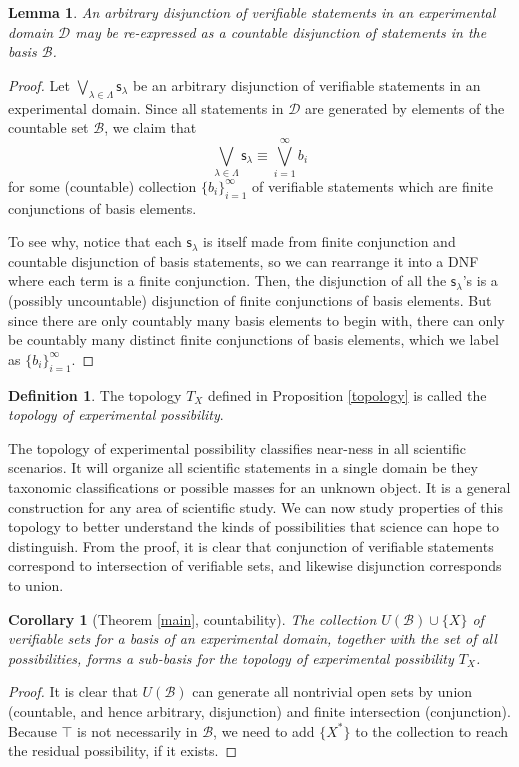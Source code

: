 \documentclass[psamsfonts]{amsart}
\newtheorem{cor}[thm]{Corollary}
\newtheorem{lem}[thm]{Lemma}
\theoremstyle{definition}
\newtheorem{defn}[thm]{Definition}
\theoremstyle{remark}
\numberwithin{equation}{section}
\def\tautology{\top}
\def\bigOR{\bigvee}
\newcommand{\stmt}[1][s] {\mathsf{#1}}
\newcommand{\edomain}[1][D] {\mathcal{#1}}
\newcommand{\basis}[1][B] {\mathcal{#1}} %
\begin{document}
\begin{lem}\label{countable_disjunction}
An arbitrary disjunction of verifiable statements in an experimental domain $\edomain$ may be re-expressed as a countable disjunction of statements in the basis $\basis$.
\end{lem}
\begin{proof}
Let $\bigOR\limits_{\lambda\in\Lambda}\stmt_{\lambda}$ be an arbitrary disjunction of verifiable statements in an experimental domain. Since all statements in $\edomain$ are generated by elements of the countable set $\basis$, we claim that $$\bigOR\limits_{\lambda\in\Lambda}\stmt_{\lambda} \equiv \bigOR\limits_{i=1}^{\infty}b_i$$ for some (countable) collection $\{b_i\}_{i=1}^{\infty}$ of verifiable statements which are finite conjunctions of basis elements. 

To see why, notice that each $\stmt_{\lambda}$ is itself made from finite conjunction and countable disjunction of basis statements, so we can rearrange it into a DNF where each term is a finite conjunction. Then, the disjunction of all the $\stmt_{\lambda}$'s is a (possibly uncountable) disjunction of finite conjunctions of basis elements. But since there are only countably many basis elements to begin with, there can only be countably many distinct finite conjunctions of basis elements, which we label as $\{b_i\}_{i=1}^{\infty}$. 
\end{proof}

\begin{defn}
The topology $T_X$ defined in Proposition \ref{topology} is called the \emph{topology of experimental possibility}.
\end{defn}

The topology of experimental possibility classifies near-ness in all scientific scenarios. It will organize all scientific statements in a single domain be they taxonomic classifications or possible masses for an unknown object. It is a general construction for any area of scientific study. We can now study properties of this topology to better understand the kinds of possibilities that science can hope to distinguish. From the proof, it is clear that conjunction of verifiable statements correspond to intersection of verifiable sets, and likewise disjunction corresponds to union. 

\begin{cor}[Theorem \ref{main}, countability]
The collection $U(\basis)\cup\{X\}$ of verifiable sets for a basis of an experimental domain, together with the set of all possibilities, forms a sub-basis for the topology of experimental possibility $T_X$.
\end{cor}
\begin{proof}
It is clear that $U(\basis)$ can generate all nontrivial open sets by union (countable, and hence arbitrary, disjunction) and finite intersection (conjunction). Because $\tautology$ is not necessarily in $\basis$, we need to add $\{X^*\}$ to the collection to reach the residual possibility, if it exists. 
\end{proof}
\end{document}
